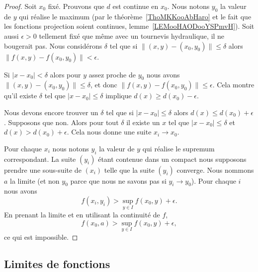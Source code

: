 \begin{proof}
	Soit \( x_0\) fixé. Prouvons que \( d\) est continue en \( x_0\). Nous notons \( y_0\) la valeur de \( y\) qui réalise le maximum (par le théorème~\ref{ThoMKKooAbHaro} et le fait que les fonctions projection soient continues, lemme~\ref{LEMooHAODooYSPmvH}). Soit aussi \( \epsilon>0\) tellement fixé que même avec un tournevis hydraulique, il ne bougerait pas. Nous considérons \( \delta\) tel que si \( \| (x,y)-(x_0,y_0) \|\leq \delta\) alors \( \| f(x,y)-f(x_0,y_0) \|<\epsilon\).

	Si \( | x-x_0 |<\delta\) alors pour \( y\) assez proche de \( y_0\) nous avons \( \| (x,y)-(x_0,y_0) \|\leq \delta\), et donc \( \| f(x,y)-f(x_0,y_0) \|\leq \epsilon \). Cela montre qu'il existe \( \delta\) tel que \( | x-x_0 |\leq \delta\) implique \( d(x)\geq d(x_0)-\epsilon\).

	Nous devons encore trouver un \( \delta\) tel que si \( | x-x_0 |\leq \delta\) alors \( d(x)\leq d(x_0)+\epsilon\). Supposons que non. Alors pour tout \( \delta\) il existe un \( x\) tel que \( | x-x_0 |\leq \delta\) et \( d(x)> d(x_0)+\epsilon\). Cela nous donne une suite \( x_i\to x_0\).

	Pour chaque \( x_i\) nous notons \( y_i\) la valeur de \( y\) qui réalise le supremum correspondant. La suite \( (y_i)\) étant contenue dans un compact nous supposons prendre une sous-suite de \( (x_i)\) telle que la suite \( (y_i)\) converge. Nous nommons \( a\) la limite (et non \( y_0\) parce que nous ne savons pas si \( y_i\to y_0\)). Pour chaque \( i\) nous avons
	\begin{equation}
		f(x_i,y_i)>\sup_{y\in I}f(x_0,y)+\epsilon.
	\end{equation}
	En prenant la limite et en utilisant la continuité de \( f\),
	\begin{equation}
		f(x_0,a)>\sup_{y\in I} f(x_0,y)+\epsilon,
	\end{equation}
	ce qui est impossible.
\end{proof}

\subsection{Limites de fonctions}

